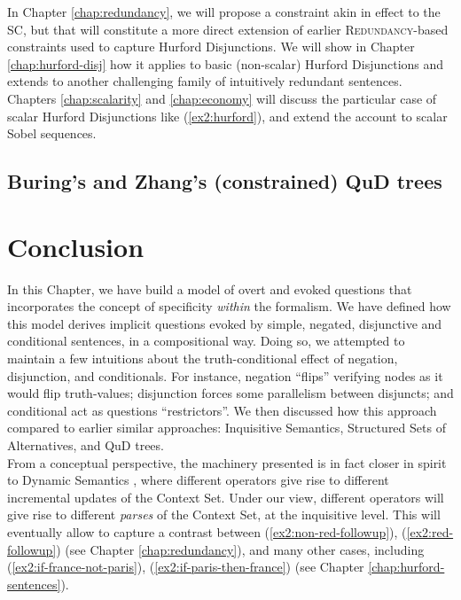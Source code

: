 In Chapter \ref{chap:redundancy}, we will propose a constraint akin in effect to the SC, but that will constitute a more direct extension of earlier \textsc{Redundancy}-based constraints used to capture Hurford Disjunctions. We will show in Chapter \ref{chap:hurford-disj} how it applies to basic (non-scalar) Hurford Disjunctions and extends to another challenging family of intuitively redundant sentences. Chapters \ref{chap:scalarity} and \ref{chap:economy} will discuss the particular case of scalar Hurford Disjunctions like (\ref{ex2:hurford}), and extend the account to scalar Sobel sequences.


\subsection{Buring's and Zhang's (constrained) QuD trees}




\section{Conclusion}
In this Chapter, we have build a model of overt and evoked questions that incorporates the concept of specificity \textit{within} the formalism. We have defined how this model derives implicit questions evoked by simple, negated, disjunctive and conditional sentences, in a compositional way. Doing so, we attempted to maintain a few intuitions about the truth-conditional effect of negation, disjunction, and conditionals. For instance, negation ``flips'' verifying nodes as it would flip truth-values; disjunction forces some parallelism between disjuncts; and conditional act as questions ``restrictors''. We then discussed how this approach compared to earlier similar approaches: Inquisitive Semantics, Structured Sets of Alternatives, and QuD trees.\\

From a conceptual perspective, the machinery presented is in fact closer in spirit to Dynamic Semantics \citep{Heim1983a,Heim1983b}, where different operators give rise to different incremental updates of the Context Set. Under our view, different operators will give rise to different \textit{parses} of the Context Set, at the inquisitive level. This will eventually allow to capture a contrast between (\ref{ex2:non-red-followup}), (\ref{ex2:red-followup}) (see Chapter \ref{chap:redundancy}), and many other cases, including (\ref{ex2:if-france-not-paris}), (\ref{ex2:if-paris-then-france}) (see Chapter \ref{chap:hurford-sentences}).





